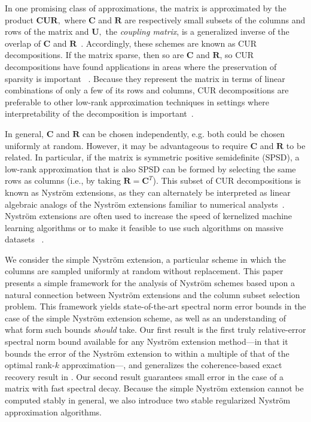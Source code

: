 \documentclass[11pt,letterpaper,twoside,reqno,nosumlimits]{amsart}
\def\transp{T}
\newcommand{\mat}[1]{\ensuremath{\mathbf{#1}}}
\theoremstyle{remark}
\begin{document}
In one promising class of approximations, the matrix is approximated by the product $\mat{C}\mat{U}\mat{R},$ where $\mat{C}$ and $\mat{R}$ are respectively small subsets of the columns and rows of the matrix and $\mat{U},$ the \emph{coupling matrix}, is a generalized inverse of the overlap of $\mat{C}$ and $\mat{R}$~\cite{DKM06}. Accordingly, these schemes are known as CUR decompositions. If the matrix sparse, then so are $\mat{C}$ and $\mat{R}$, so CUR decompositions have found applications in areas where the preservation of sparsity is important ~\cite{SXZF07}. Because they represent the matrix in terms of linear combinations of only a few of its rows and columns, CUR decompositions are preferable to other low-rank approximation techniques in settings where interpretability of the decomposition is important~\cite{DM09CUR,HMT08}.

In general, $\mat{C}$ and $\mat{R}$ can be chosen independently, e.g. both could be chosen uniformly at random. However, it may be advantageous to require $\mat{C}$ and $\mat{R}$ to be related. In particular, if the matrix is symmetric positive semidefinite (SPSD), a low-rank approximation that is also SPSD can be formed by selecting the same rows as columns (i.e., by taking $\mat{R} = \mat{C}^\transp$). This subset of CUR decompositions is known as Nystr\"om extensions, as they can alternately be interpreted as linear algebraic analogs of the Nystr\"om extensions familiar to numerical analysts~\cite{SW01}. Nystr\"om extensions are often used to increase the speed of kernelized machine learning algorithms or to make it feasible to use such algorithms on massive datasets ~\cite{CMT10,SW01,BCFM04,TKR08,KPSH07}.  


We consider the simple Nystr\"om extension, a particular scheme in which the columns are sampled uniformly at random without replacement. This paper presents a simple framework for the analysis of Nystr\"om schemes based upon a natural connection between Nystr\"om extensions and the column subset selection problem. This framework yields state-of-the-art spectral norm error bounds in the case of the simple Nystr\"om extension scheme, as well as an understanding of what form such bounds \emph{should} take. Our first result is the first truly relative-error spectral norm bound available for any Nystr\"om extension method---in that it bounds the error of the Nystr\"om extension to within a multiple of that of the optimal rank-$k$ approximation---, and generalizes the coherence-based exact recovery result in \cite{TR10}. Our second result guarantees small error in the case of a matrix with fast spectral decay. Because the simple Nystr\"om extension cannot be computed stably in general, we also introduce two stable regularized Nystr\"om approximation algorithms.
\end{document}
